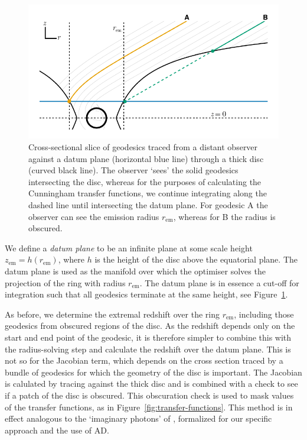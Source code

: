 \documentclass[fleqn,usenatbib]{mnras}
\newcommand{\rhoem}{r_\text{em}}
\begin{document}
\begin{figure}
    \centering
    \includegraphics[width=0.95\columnwidth]{figures/datum-plane.pdf}
    \caption{Cross-sectional slice of geodesics traced from a distant observer
        against a datum plane (horizontal blue line) through a thick disc
        (curved black line). The observer `sees' the solid geodesics
        intersecting the disc, whereas for the purposes of calculating the
        Cunningham transfer functions, we continue integrating along the dashed
        line until intersecting the datum plane. For geodesic A the observer
        can see the emission radius $\rhoem$, whereas for B the radius is
        obscured.
}
    \label{fig:datum-plane-tracing}
\end{figure}

We define a \emph{datum plane} to be an infinite plane at some scale height
$z_\text{em} = h(\rhoem)$, where $h$ is the height of the disc above the
equatorial plane. The datum plane is used as the manifold over which the
optimiser solves the projection of the ring with radius $\rhoem$. The datum
plane is in essence a cut-off for integration such that all geodesics terminate
at the same height, see Figure~\ref{fig:datum-plane-tracing}.

As before, we determine the extremal redshift over the ring $\rhoem$, including
those geodesics from obscured regions of the disc. As the redshift depends only
on the start and end point of the geodesic, it is therefore simpler to combine
this with the radius-solving step and calculate the redshift over the datum
plane. This is not so for the Jacobian term, which depends on the cross section
traced by a bundle of geodesics for which the geometry of the disc is important.
The Jacobian is calulated by tracing against the thick disc and is combined with
a check to see if a patch of the disc is obscured. This obscuration check is
used to mask values of the transfer functions, as in
Figure~\ref{fig:transfer-functions}. This method is in effect analogous to the
`imaginary photons' of \cite{abdikamalov_testing_2020}, formalized for our
specific approach and the use of AD.
\end{document}
